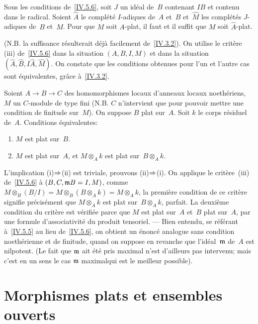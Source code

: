 \begin{corollaire}
\label{IV.5.8}
Sous les conditions de~\ref{IV.5.6}, soit $J$ un id\'eal de~$B$
contenant $IB$ et contenu dans le radical. Soient $\hat A$ le
compl\'et\'e $I$-adiques de~$A$ et~$\hat B$ et~$\hat M$ les
compl\'et\'es $J$-adiques de~$B$ et~$M$. Pour que $M$ soit
$A$-plat, il faut et il suffit que $M$ soit $\hat A$-plat.
\end{corollaire}

(N.B. la suffisance r\'esulterait d\'ej\`a facilement
de~\ref{IV.3.2}). On utilise le crit\`ere (iii) de~\ref{IV.5.6}
dans la situation $(A,B,I,M)$ et dans la situation $(\hat A,\hat
B,I\hat A, \hat M)$. On constate que les conditions obtenues pour
l'un et l'autre cas sont \'equivalentes, gr\^ace
\`a~\ref{IV.3.2}.

\begin{corollaire}
\label{IV.5.9}
Soient $A\to B\to C$ des homomorphismes locaux d'anneaux locaux
noe\-th\'e\-riens, $M$ un $C$-module de type fini (N.B. $C$
n'intervient que pour pouvoir mettre une condition de finitude sur~$M$). On suppose $B$ plat sur~$A$. Soit $k$ le corps r\'esiduel
de~$A$. Conditions \'equivalentes:
\begin{enumerate}
\item[(i)] $M$ est plat sur~$B$.
\item[(ii)] $M$ est plat sur~$A$, et $M\otimes_A k$ est plat sur~$B\otimes_A k$.
\end{enumerate}
\end{corollaire}

L'implication (i)$\To$(ii) est triviale, prouvons
(ii)$\To$(i). On applique le crit\`ere~(iii)
de~\ref{IV.5.6} \`a $(B,C,\mathfrak{m}B=I,M)$, comme
$M\otimes_B(B/I)=M\otimes_B(B\otimes_A k) = M\otimes_A k$, la
premi\`ere condition de ce crit\`ere signifie pr\'ecis\'ement
que $M\otimes_A k$ est plat sur~$B\otimes_A k$,
parfait. La deuxi\`eme condition du crit\`ere est
v\'erifi\'ee parce que $M$ est plat sur~$A$ et~$B$ plat sur~$A$,
par une formule d'associativit\'e du produit tensoriel. --- Bien
entendu, se r\'ef\'erant \`a~\ref{IV.5.5} au lieu
de~\ref{IV.5.6}, on obtient un \'enonc\'e analogue sans condition
noeth\'erienne et de finitude, quand on suppose en revanche que
l'id\'eal~$\mathfrak{m}$ de~$A$ est nilpotent. (Le fait que $\mathfrak{m}$
ait \'et\'e pris maximal n'est d'ailleurs pas intervenu; mais
c'est en un sens le cas \og $\mathfrak{m}$ maximal\fg qui est \og le meilleur
possible\fg).

\section{Morphismes plats et ensembles ouverts}
\label{IV.6}

